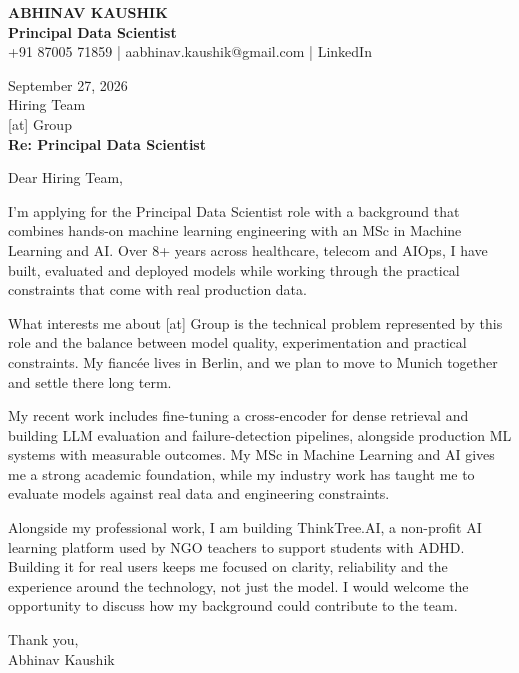 \documentclass[10pt,a4paper]{article}
\begin{document}
\begin{center}
{\Large\bfseries ABHINAV KAUSHIK}\\[2pt]
{\bfseries Principal Data Scientist}\\[2pt]
+91 87005 71859 \quad | \quad aabhinav.kaushik@gmail.com \quad | \quad LinkedIn
\end{center}
\vspace{8pt}
September 27, 2026\\[6pt]
Hiring Team\\
{[at]} Group\\[4pt]
\textbf{Re: Principal Data Scientist}

Dear Hiring Team,

I’m applying for the Principal Data Scientist role with a background that combines hands-on machine learning engineering with an MSc in Machine Learning and AI. Over 8+ years across healthcare, telecom and AIOps, I have built, evaluated and deployed models while working through the practical constraints that come with real production data.

What interests me about [at] Group is the technical problem represented by this role and the balance between model quality, experimentation and practical constraints. My fiancée lives in Berlin, and we plan to move to Munich together and settle there long term.

My recent work includes fine-tuning a cross-encoder for dense retrieval and building LLM evaluation and failure-detection pipelines, alongside production ML systems with measurable outcomes. My MSc in Machine Learning and AI gives me a strong academic foundation, while my industry work has taught me to evaluate models against real data and engineering constraints.

Alongside my professional work, I am building ThinkTree.AI, a non-profit AI learning platform used by NGO teachers to support students with ADHD. Building it for real users keeps me focused on clarity, reliability and the experience around the technology, not just the model. I would welcome the opportunity to discuss how my background could contribute to the team.

Thank you,\\
Abhinav Kaushik
\end{document}

